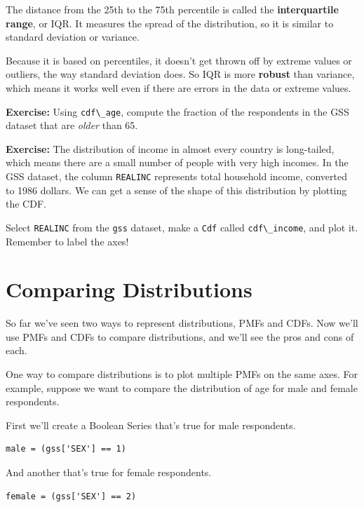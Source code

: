 The distance from the 25th to the 75th percentile is called the
\textbf{interquartile range}, or IQR. It measures the spread of the
distribution, so it is similar to standard deviation or variance.

Because it is based on percentiles, it doesn't get thrown off by extreme
values or outliers, the way standard deviation does. So IQR is more
\textbf{robust} than variance, which means it works well even if there
are errors in the data or extreme values.

\textbf{Exercise:} Using \passthrough{\lstinline!cdf\_age!}, compute the
fraction of the respondents in the GSS dataset that are \emph{older}
than 65.

\textbf{Exercise:} The distribution of income in almost every country is
long-tailed, which means there are a small number of people with very
high incomes. In the GSS dataset, the column
\passthrough{\lstinline!REALINC!} represents total household income,
converted to 1986 dollars. We can get a sense of the shape of this
distribution by plotting the CDF.

Select \passthrough{\lstinline!REALINC!} from the
\passthrough{\lstinline!gss!} dataset, make a
\passthrough{\lstinline!Cdf!} called
\passthrough{\lstinline!cdf\_income!}, and plot it. Remember to label
the axes!

\hypertarget{comparing-distributions}{%
\section{Comparing Distributions}\label{comparing-distributions}}

So far we've seen two ways to represent distributions, PMFs and CDFs.
Now we'll use PMFs and CDFs to compare distributions, and we'll see the
pros and cons of each.

One way to compare distributions is to plot multiple PMFs on the same
axes. For example, suppose we want to compare the distribution of age
for male and female respondents.

First we'll create a Boolean Series that's true for male respondents.

\begin{lstlisting}[]
male = (gss['SEX'] == 1)
\end{lstlisting}

And another that's true for female respondents.

\begin{lstlisting}[]
female = (gss['SEX'] == 2)
\end{lstlisting}

